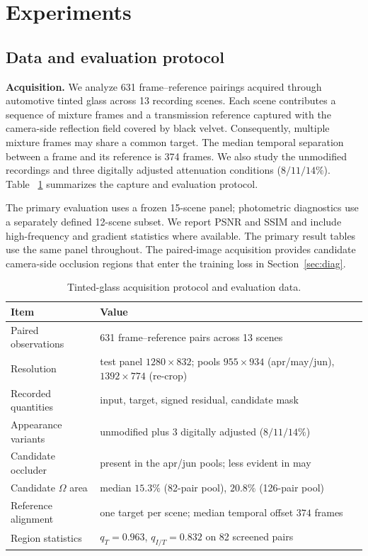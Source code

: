 \section{Experiments}
\label{sec:exp}

\subsection{Data and evaluation protocol}
\label{sec:data}

\textbf{Acquisition.}
We analyze 631 frame--reference pairings acquired through automotive
tinted glass across 13 recording scenes. Each scene contributes a
sequence of mixture frames and a transmission reference captured
with the camera-side reflection field covered by black velvet.
Consequently, multiple mixture frames may share a common target.
The median temporal separation between a frame and its reference
is 374 frames. We also study the unmodified recordings and three
digitally adjusted attenuation conditions ($8/11/14\%$). Table~
\ref{tab:data} summarizes the capture and evaluation protocol.

The primary evaluation uses a frozen 15-scene panel; photometric
diagnostics use a separately defined 12-scene subset. We report
PSNR and SSIM and include high-frequency and gradient statistics
where available. The primary result tables use the same panel
throughout. The paired-image acquisition provides candidate
camera-side occlusion regions that enter the training loss in
Section~\ref{sec:diag}.


\begin{table}[t]
\centering
\caption{Tinted-glass acquisition protocol and evaluation data.}
\label{tab:data}
\small
\begin{tabular}{@{}p{1.9cm}p{5.6cm}@{}}
\toprule
Item & Value \\
\midrule
Paired observations & 631 frame--reference pairs across 13 scenes \\
Resolution & test panel $1280\times832$; pools $955\times934$ (apr/may/jun), $1392\times774$ (re-crop) \\
Recorded quantities & input, target, signed residual, candidate mask \\
Appearance variants & unmodified plus 3 digitally adjusted ($8/11/14\%$) \\
Candidate occluder & present in the apr/jun pools; less evident in may \\
Candidate $\Omega$ area & median $15.3\%$ (82-pair pool), $20.8\%$ (126-pair pool) \\
Reference alignment & one target per scene; median temporal offset $374$ frames \\
Region statistics & $q_T=0.963$, $q_{I/T}=0.832$ on 82 screened pairs \\
\bottomrule
\end{tabular}
\end{table}


